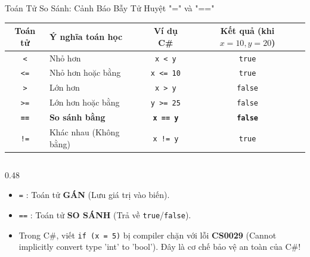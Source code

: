 \documentclass[aspectratio=169, 10pt]{beamer}
\begin{document}
\begin{frame}[fragile]{Toán Tử So Sánh: Cảnh Báo Bẫy Tử Huyệt "=" và "=="}
  \begin{table}[h]
    \centering
    \small
    \begin{tabularx}{0.95\textwidth}{c l c c}
      \toprule
      \textbf{Toán tử} & \textbf{Ý nghĩa toán học} & \textbf{Ví dụ C\#} & \textbf{Kết quả (khi $x = 10, y = 20$)} \\
      \midrule
      \texttt{<} & Nhỏ hơn & \texttt{x < y} & \texttt{true} \\
      \texttt{<=} & Nhỏ hơn hoặc bằng & \texttt{x <= 10} & \texttt{true} \\
      \texttt{>} & Lớn hơn & \texttt{x > y} & \texttt{false} \\
      \texttt{>=} & Lớn hơn hoặc bằng & \texttt{y >= 25} & \texttt{false} \\
      \textbf{\texttt{==}} & \textbf{So sánh bằng} & \textbf{\texttt{x == y}} & \textbf{\texttt{false}} \\
      \texttt{!=} & Khác nhau (Không bằng) & \texttt{x != y} & \texttt{true} \\
      \bottomrule
    \end{tabularx}
  \end{table}

  \begin{columns}[T]
    \begin{column}{0.48\textwidth}
      \begin{tcolorbox}[colback=AlertRed!10,colframe=AlertRed,title=\textbf{Lỗi kinh điển: Nhầm lẫn '=' và '=='},fonttitle=\small\bfseries]
        \begin{itemize}\footnotesize
          \item \texttt{=} : Toán tử \textbf{GÁN} (Lưu giá trị vào biến).
          \item \texttt{==} : Toán tử \textbf{SO SÁNH} (Trả về \texttt{true}/\texttt{false}).
          \item Trong C\#, viết \texttt{if (x = 5)} bị compiler chặn với lỗi \textbf{CS0029} (Cannot implicitly convert type 'int' to 'bool'). Đây là cơ chế bảo vệ an toàn của C\#!
        \end{itemize}
      \end{tcolorbox}
    \end{column}


\end{columns}
\end{frame}
\end{document}
